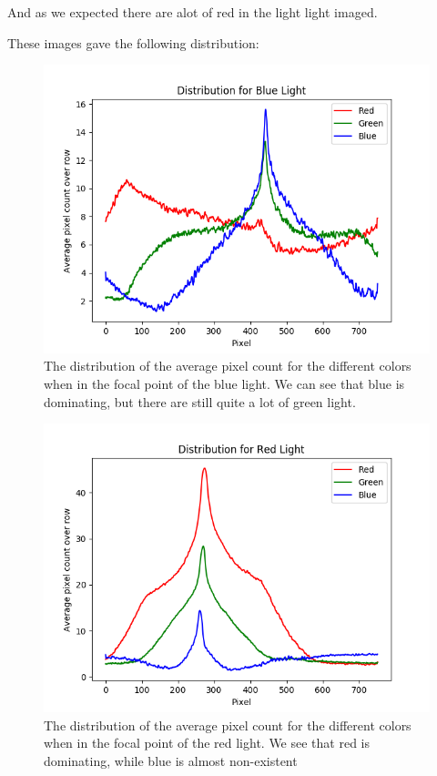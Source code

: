 \documentclass{emulateapj}
\begin{document}
And as we expected there are alot of red in the light light imaged.

These images gave the following distribution:

\begin{figure}[H]
\centering
\includegraphics[scale=0.3]{blueDist.png}
\caption{The distribution of the average pixel count for the different colors when in the focal point of the blue light. We can see that blue is dominating, but there are still quite a lot of green light.}
\label{img:blueDist}
\end{figure}

\begin{figure}[H]
\centering
\includegraphics[scale=0.3]{redDist.png}
\caption{The distribution of the average pixel count for the different colors when in the focal point of the red light. We see that red is dominating, while blue is almost non-existent}
\label{img:redDist}
\end{figure}
\end{document}
